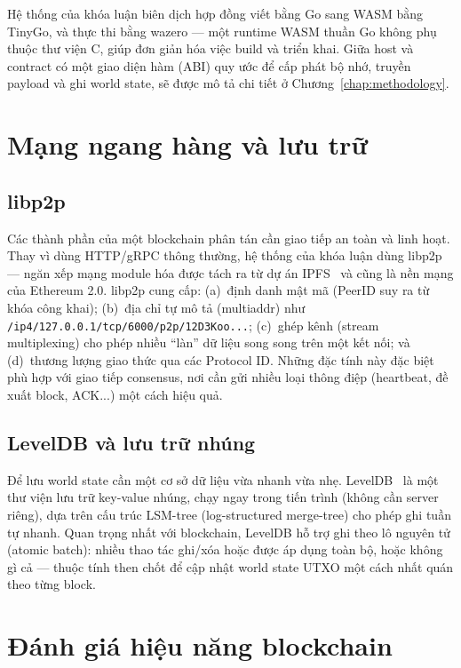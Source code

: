 Hệ thống của khóa luận biên dịch hợp đồng viết bằng Go sang WASM bằng
TinyGo, và thực thi bằng wazero --- một runtime WASM thuần Go
không phụ thuộc thư viện C, giúp đơn giản hóa việc build và triển khai. Giữa host
và contract có một giao diện hàm (ABI) quy ước để cấp phát bộ nhớ, truyền payload
và ghi world state, sẽ được mô tả chi tiết ở Chương~\ref{chap:methodology}.

\section{Mạng ngang hàng và lưu trữ}
\label{sec:p2p-storage}

\subsection{libp2p}

Các thành phần của một blockchain phân tán cần giao tiếp an toàn và linh hoạt.
Thay vì dùng HTTP/gRPC thông thường, hệ thống của khóa luận dùng
libp2p~\cite{libp2p} --- ngăn xếp mạng module hóa được tách ra từ dự án
IPFS~\cite{benet2014ipfs} và cũng là nền mạng của Ethereum 2.0. libp2p cung cấp:
(a)~định danh mật mã (PeerID suy ra từ khóa công khai); (b)~địa
chỉ tự mô tả (multiaddr) như \texttt{/ip4/127.0.0.1/tcp/6000/p2p/12D3Koo...};
(c)~ghép kênh (stream multiplexing) cho phép nhiều ``làn'' dữ liệu song
song trên một kết nối; và (d)~thương lượng giao thức qua các Protocol
ID. Những đặc tính này đặc biệt phù hợp với giao tiếp consensus, nơi cần gửi
nhiều loại thông điệp (heartbeat, đề xuất block, ACK...) một cách hiệu quả.

\subsection{LevelDB và lưu trữ nhúng}

Để lưu world state cần một cơ sở dữ liệu vừa nhanh vừa nhẹ.
LevelDB~\cite{leveldb} là một thư viện lưu trữ key-value nhúng, chạy
ngay trong tiến trình (không cần server riêng), dựa trên cấu trúc LSM-tree
(log-structured merge-tree) cho phép ghi tuần tự nhanh. Quan trọng nhất với
blockchain, LevelDB hỗ trợ ghi theo lô nguyên tử (atomic batch): nhiều
thao tác ghi/xóa hoặc được áp dụng toàn bộ, hoặc không gì cả --- thuộc tính then
chốt để cập nhật world state UTXO một cách nhất quán theo từng block.

\section{Đánh giá hiệu năng blockchain}
\label{sec:bench-related}

